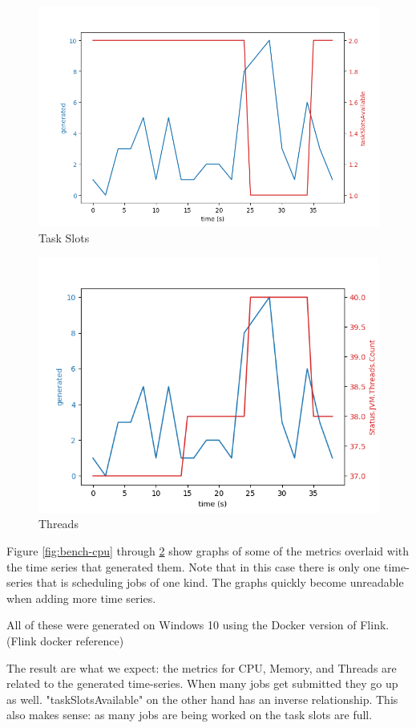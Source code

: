 \begin{figure}
   \centering
   \includegraphics[scale=0.60]{figures/task-slots.png}
\caption{Task Slots}    
\label{fig:bench-taks}
\end{figure}

\begin{figure}
   \centering
   \includegraphics[scale=0.70]{figures/threads.png}
\caption{Threads}    
\label{fig:bench-threads}
\end{figure}

Figure \ref{fig:bench-cpu} through \ref{fig:bench-threads} show graphs of some of the metrics overlaid with the time series that generated them. Note that in this case there is only one time-series that is scheduling jobs of one kind. The graphs quickly become unreadable when adding more time series. 

All of these were generated on Windows 10 using the Docker version of Flink. (Flink docker reference)

The result are what we expect: the metrics for CPU, Memory, and Threads are related to the generated time-series. When many jobs get submitted they go up as well. "taskSlotsAvailable" on the other hand has an inverse relationship. This also makes sense: as many jobs are being worked on the task slots are full. 